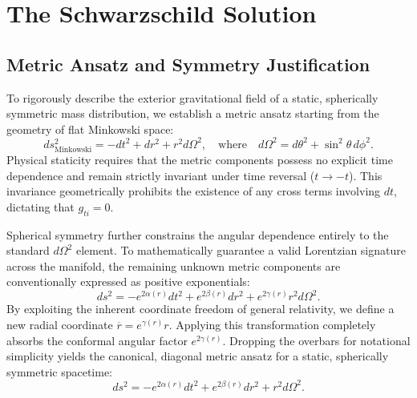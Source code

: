 \documentclass[11pt, a4paper]{report}
\begin{document}
\section{The Schwarzschild Solution}

\subsection{Metric Ansatz and Symmetry Justification}
To rigorously describe the exterior gravitational field of a static, spherically symmetric mass distribution, we establish a metric ansatz starting from the geometry of flat Minkowski space:
\begin{equation}
ds_{\text{Minkowski}}^2 = -dt^2 + dr^2 + r^2 d\Omega^2, \quad \text{where} \quad d\Omega^2 = d\theta^2 + \sin^2\theta \, d\phi^2.
\end{equation}
Physical staticity requires that the metric components possess no explicit time dependence and remain strictly invariant under time reversal ($t \rightarrow -t$). This invariance geometrically prohibits the existence of any cross terms involving $dt$, dictating that $g_{ti} = 0$. 

Spherical symmetry further constrains the angular dependence entirely to the standard $d\Omega^2$ element. To mathematically guarantee a valid Lorentzian signature across the manifold, the remaining unknown metric components are conventionally expressed as positive exponentials:
\begin{equation}
ds^2 = -e^{2\alpha(r)} dt^2 + e^{2\beta(r)} dr^2 + e^{2\gamma(r)} r^2 d\Omega^2.
\end{equation}
By exploiting the inherent coordinate freedom of general relativity, we define a new radial coordinate $\overline{r} = e^{\gamma(r)} r$. Applying this transformation completely absorbs the conformal angular factor $e^{2\gamma(r)}$. Dropping the overbars for notational simplicity yields the canonical, diagonal metric ansatz for a static, spherically symmetric spacetime:
\begin{equation}
ds^2 = -e^{2\alpha(r)} dt^2 + e^{2\beta(r)} dr^2 + r^2 d\Omega^2.
\end{equation}
\end{document}
